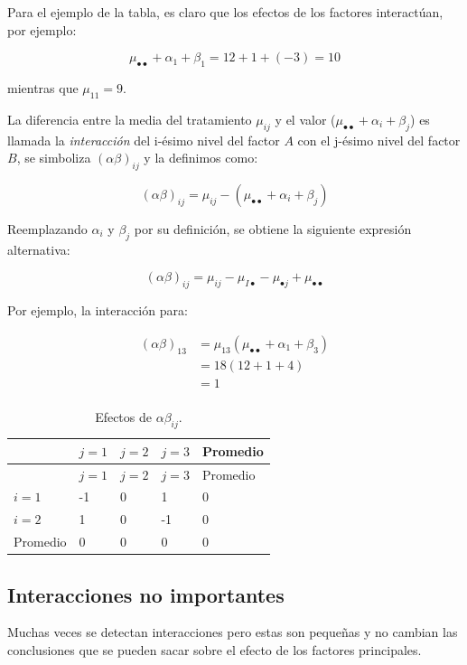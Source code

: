 \documentclass[]{book}
\theoremstyle{definition}
\theoremstyle{definition}
\theoremstyle{definition}
\theoremstyle{remark}
\begin{document}
Para el ejemplo de la tabla, es claro que los efectos de los factores
interactúan, por ejemplo:

\[
\mu_{\bullet \bullet} + \alpha_{1} + \beta_{1} = 12 + 1 + ( - 3) = 10
\]

mientras que \(\mu_{11} = 9\).

La diferencia entre la media del tratamiento \(\mu_{ij}\) y el valor
(\(\mu_{\bullet \bullet} + \alpha_{i} + \beta_{j}\)) es llamada la
\emph{interacción} del i-ésimo nivel del factor \(A\) con el j-ésimo
nivel del factor \(B\), se simboliza \(\left( \alpha\beta \right)_{ij}\)
y la definimos como:

\[
\left( \alpha\beta \right)_{ij} = \mu_{ij} - (\mu_{\bullet \bullet} + \alpha_{i} + \beta_{j})
\]

Reemplazando \(\alpha_{i}\) y \(\beta_{j}\) por su definición, se
obtiene la siguiente expresión alternativa:

\[
\left( \alpha\beta \right)_{ij} = \mu_{ij} - \mu_{I \bullet} - \mu_{\bullet j} + \mu_{\bullet \bullet}
\]

Por ejemplo, la interacción para:

\[
\begin{aligned}
\left( \alpha\beta \right)_{13}& = \mu_{13}\left( \mu_{\bullet \bullet} + \alpha_{1} + \beta_{3} \right) \\
& = 18\left( 12 + 1 + 4 \right) \\
& = 1 \\
\end{aligned}
\]

\begin{longtable}[]{@{}lllll@{}}
\caption{\label{tab:efectos} Efectos de
\(\alpha \beta_{ij}\).}\tabularnewline
\toprule
& \(j = 1\) & \(j = 2\) & \(j = 3\) & Promedio\tabularnewline
\midrule
\endfirsthead
\toprule
& \(j = 1\) & \(j = 2\) & \(j = 3\) & Promedio\tabularnewline
\midrule
\endhead
\(i = 1\) & -1 & 0 & 1 & 0\tabularnewline
\(i = 2\) & 1 & 0 & -1 & 0\tabularnewline
Promedio & 0 & 0 & 0 & 0\tabularnewline
\bottomrule
\end{longtable}

\hypertarget{interacciones-no-importantes}{%
\subsection{Interacciones no
importantes}\label{interacciones-no-importantes}}

Muchas veces se detectan interacciones pero estas son pequeñas y no
cambian las conclusiones que se pueden sacar sobre el efecto de los
factores principales.
\end{document}
